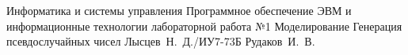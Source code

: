 \documentclass{bmstu}
\begin{document}
\makereporttitle
{Информатика и системы управления} %
{Программное обеспечение ЭВМ и информационные технологии}
{лабораторной работа №1} %
{Моделирование} %
{Генерация псевдослучайных чисел} %
{} %
{Лысцев~Н.~Д./ИУ7-73Б} %
{Рудаков~И.~В.} %
{}

\maketableofcontents

%


%
%
%

\end{document}
